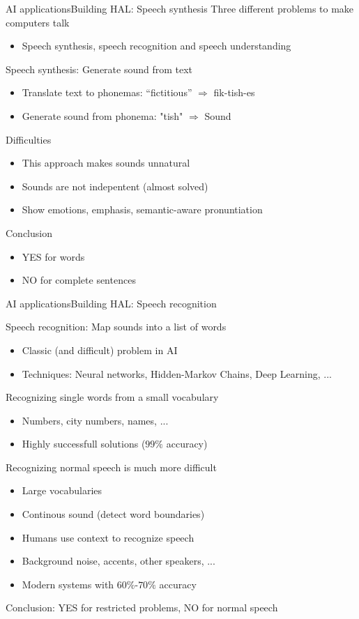 \documentclass[10pt,compress]{beamer} %
\begin{document}
\begin{frame}{AI applications}{Building HAL: Speech synthesis}
	Three different problems to make computers talk
	\begin{itemize}
		\item Speech synthesis, speech recognition and speech understanding
	\end{itemize}
	Speech synthesis: Generate sound from text
	\begin{itemize}
		\item Translate text to phonemas: “fictitious”  $\Rightarrow$ fik-tish-es
		\item Generate sound from phonema: "tish" $\Rightarrow$ Sound
	\end{itemize}
	Difficulties
	\begin{itemize}
		\item This approach makes sounds unnatural
		\item Sounds are not indepentent (almost solved)
		\item Show emotions, emphasis, semantic-aware pronuntiation
	\end{itemize}
	Conclusion
	\begin{itemize}
		\item YES for words
		\item NO for complete sentences
	\end{itemize}
\end{frame}

\begin{frame}{AI applications}{Building HAL: Speech recognition}
\footnotesize{
	Speech recognition: Map sounds into a list of words
	\begin{itemize}
		\item Classic (and difficult) problem in AI
		\item Techniques: Neural networks, Hidden-Markov Chains, Deep Learning, ...
	\end{itemize}
	Recognizing single words from a small vocabulary
	\begin{itemize}
		\item Numbers, city numbers, names, ...
		\item Highly successfull solutions ($99\%$ accuracy)
	\end{itemize}
	Recognizing normal speech is much more difficult
	\begin{itemize}
		\item Large vocabularies
		\item Continous sound (detect word boundaries)
		\item Humans use context to recognize speech
		\item Background noise, accents, other speakers, ...
		\item Modern systems with $60\%$-$70\%$ accuracy
	\end{itemize}
	Conclusion: YES for restricted problems, NO for normal speech
}
\end{frame}
\end{document}
